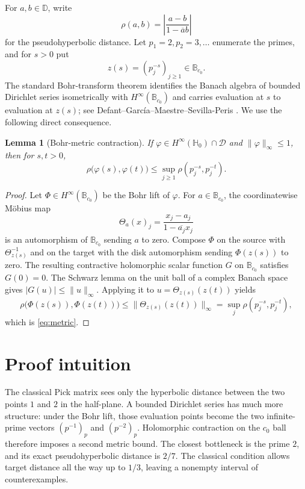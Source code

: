 \documentclass[11pt]{article}
\newtheorem{lemma}{Lemma}
\newcommand{\D}{\mathbb D}
\newcommand{\Hh}{\mathbb H}
\newcommand{\cD}{\mathcal D}
\newcommand{\B}{\mathbb B}
\begin{document}
For $a,b\in\D$, write
\[
 \rho(a,b)=\left|\frac{a-b}{1-\overline a b}\right|
\]
for the pseudohyperbolic distance.  Let $p_1=2,p_2=3,\ldots$ enumerate the
primes, and for $s>0$ put
\[
 z(s)=(p_j^{-s})_{j\geq1}\in\B_{c_0}.
\]
The standard Bohr-transform theorem identifies the Banach algebra of bounded
Dirichlet series isometrically with $H^\infty(\B_{c_0})$ and carries
evaluation at $s$ to evaluation at $z(s)$; see
Defant--Garc\'ia--Maestre--Sevilla-Peris \cite{DGMS}.  We use the following
direct consequence.

\begin{lemma}[Bohr-metric contraction]
\label{lem:metric}
If $\varphi\in H^\infty(\Hh_0)\cap\cD$ and
$\lVert\varphi\rVert_\infty\leq1$, then for $s,t>0$,
\begin{equation}
 \rho\bigl(\varphi(s),\varphi(t)\bigr)
 \leq \sup_{j\geq1}\rho(p_j^{-s},p_j^{-t}).
 \label{eq:metric}
\end{equation}
\end{lemma}

\begin{proof}
Let $\Phi\in H^\infty(\B_{c_0})$ be the Bohr lift of $\varphi$.  For
$a\in\B_{c_0}$, the coordinatewise M\"obius map
\[
 \Theta_a(x)_j=\frac{x_j-a_j}{1-\overline{a_j}x_j}
\]
is an automorphism of $\B_{c_0}$ sending $a$ to zero.  Compose $\Phi$ on the
source with $\Theta_{z(s)}^{-1}$ and on the target with the disk automorphism
sending $\Phi(z(s))$ to zero.  The resulting contractive holomorphic scalar
function $G$ on $\B_{c_0}$ satisfies $G(0)=0$.  The Schwarz lemma on the unit
ball of a complex Banach space gives $|G(u)|\leq\lVert u\rVert_\infty$.
Applying it to $u=\Theta_{z(s)}(z(t))$ yields
\[
 \rho\bigl(\Phi(z(s)),\Phi(z(t))\bigr)
 \leq \lVert\Theta_{z(s)}(z(t))\rVert_\infty
 =\sup_j\rho(p_j^{-s},p_j^{-t}),
\]
which is \eqref{eq:metric}.
\end{proof}

\section{Proof intuition}

The classical Pick matrix sees only the hyperbolic distance between the two
points $1$ and $2$ in the half-plane.  A bounded Dirichlet series has much
more structure: under the Bohr lift, those evaluation points become the two
infinite-prime vectors $(p^{-1})_p$ and $(p^{-2})_p$.  Holomorphic contraction
on the $c_0$ ball therefore imposes a second metric bound.  The closest
bottleneck is the prime $2$, and its exact pseudohyperbolic distance is
$2/7$.  The classical condition allows target distance all the way up to
$1/3$, leaving a nonempty interval of counterexamples.
\end{document}
